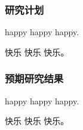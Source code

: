 
\subsubsection{研究计划}

happy happy happy.

快乐 快乐 快乐。

\subsubsection{预期研究结果}

happy happy happy.

快乐 快乐 快乐。

\clearpage